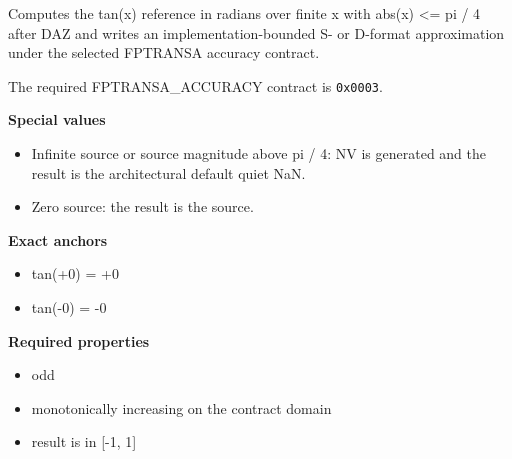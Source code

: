 Computes the tan(x) reference in radians over finite x with abs(x) \textless{}= pi / 4 after DAZ and writes an implementation-bounded S- or D-format approximation under the selected FPTRANSA accuracy contract.

The required FPTRANSA\_ACCURACY contract is \texttt{0x0003}.

\textbf{Special values}\par
\begin{itemize}
\item Infinite source or source magnitude above pi / 4: NV is generated and the result is the architectural default quiet NaN.
\item Zero source: the result is the source.
\end{itemize}

\textbf{Exact anchors}\par
\begin{itemize}
\item tan(+0) = +0
\item tan(-0) = -0
\end{itemize}

\textbf{Required properties}\par
\begin{itemize}
\item odd
\item monotonically increasing on the contract domain
\item result is in [-1, 1]
\end{itemize}
